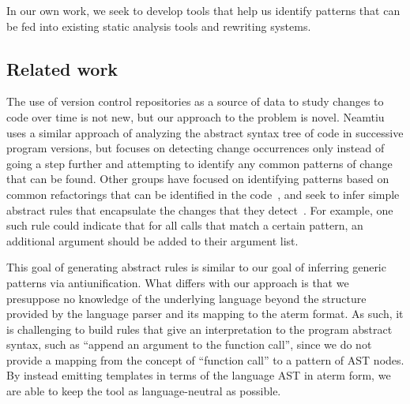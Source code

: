 
In our own work, we seek to develop tools that help us identify patterns that
can be fed into existing static analysis tools and rewriting systems.

\subsection{Related work}

The use of version control repositories as a source of data to study changes
to code over time is not new, but our approach to the problem is novel.
Neamtiu~\cite{neamtiu05understand} uses a similar approach of analyzing the
abstract syntax tree of code in successive program versions, but focuses on
detecting change occurrences only instead of going a step further and
attempting to identify any common patterns of change that can be found.  
Other groups have focused on identifying patterns based on common
refactorings that can be identified in the code~\cite{weissgerber06identify},
and seek to infer simple abstract rules that encapsulate the changes
that they detect~\cite{kim07automatic}.  For example, one such rule could
indicate that for all calls that match a certain pattern, an additional
argument should be added to their argument list.

This goal of generating abstract rules is similar to our goal of inferring
generic patterns via antiunification.  What differs with our approach is
that we presuppose no knowledge of the underlying language beyond the structure
provided by the language parser and its mapping to the aterm format.  As such,
it is challenging to build rules that give an interpretation to the program
abstract syntax, such as ``append an argument to the function call'', since
we do not provide a mapping from the concept of ``function call'' to a pattern
of AST nodes.  By instead emitting templates in terms of the language AST in
aterm form, we are able to keep the tool as language-neutral as possible.

